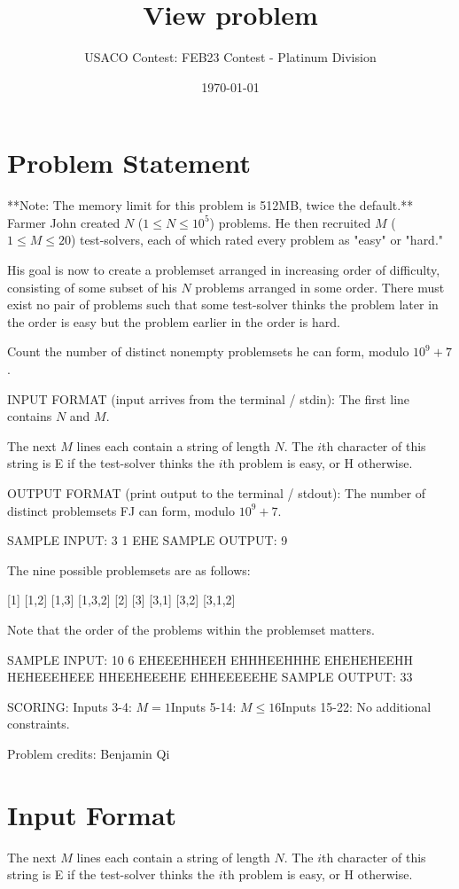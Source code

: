 \documentclass[12pt]{article}
\title{View problem}
\author{USACO Contest: FEB23 Contest - Platinum Division}
\date{\today}
\begin{document}
\maketitle

\section*{Problem Statement}


**Note: The memory limit for this problem is 512MB, twice the default.**
Farmer John created $N$ ($1\le N\le 10^5$) problems. He then recruited $M$
($1\le M\le 20$) test-solvers, each of which rated every problem as "easy" or
"hard." 

His goal is now to create a problemset arranged in increasing order of
difficulty, consisting of some subset of his $N$ problems arranged in some
order. There must exist no pair of problems such that some test-solver thinks
the problem later in the order is easy but the problem earlier in the order is
hard. 

Count the number of distinct nonempty problemsets he can form, modulo $10^9+7$.

INPUT FORMAT (input arrives from the terminal / stdin):
The first line contains $N$ and $M$.

The next $M$ lines each contain a string of length $N$. The $i$th character of
this  string is E if the test-solver thinks the $i$th problem is easy, or H
otherwise.

OUTPUT FORMAT (print output to the terminal / stdout):
The number of distinct problemsets FJ can form, modulo $10^9+7$.


SAMPLE INPUT:
3 1
EHE
SAMPLE OUTPUT: 
9

The nine possible problemsets are as follows:


[1]
[1,2]
[1,3]
[1,3,2]
[2]
[3]
[3,1]
[3,2]
[3,1,2]

Note that the order of the problems within the problemset matters.

SAMPLE INPUT:
10 6
EHEEEHHEEH
EHHHEEHHHE
EHEHEHEEHH
HEHEEEHEEE
HHEEHEEEHE
EHHEEEEEHE
SAMPLE OUTPUT: 
33

SCORING:
Inputs 3-4: $M=1$Inputs 5-14: $M\le 16$Inputs 15-22: No additional constraints.


Problem credits: Benjamin Qi



\section*{Input Format}
The next $M$ lines each contain a string of length $N$. The $i$th character of
this  string is E if the test-solver thinks the $i$th problem is easy, or H
otherwise.
\end{document}
